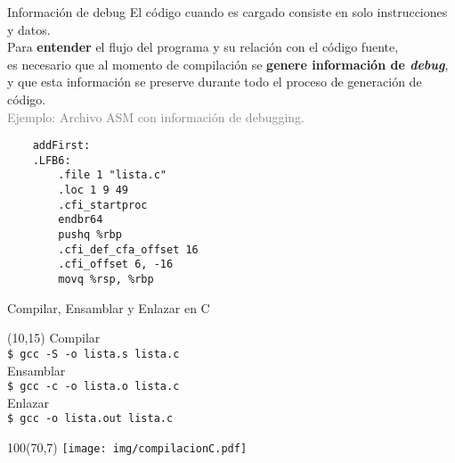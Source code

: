 \documentclass[aspectratio=169]{beamer}
\begin{document}
\begin{frame}[fragile,t]{Información de debug}
    El código cuando es cargado consiste en solo instrucciones y datos.\\
    \bigskip
    Para \textbf{entender} el flujo del programa y su relación con el código fuente,\\
    es necesario que al momento de compilación se \textbf{genere información de \emph{debug}},\\
    y que esta información se preserve durante todo el proceso de generación de código.\\
    \bigskip
    \pause
    \textcolor{gray}{Ejemplo: Archivo ASM con información de debugging.}
    { \small
    \begin{verbatim}
    addFirst:
    .LFB6:
        .file 1 "lista.c"
        .loc 1 9 49
        .cfi_startproc
        endbr64
        pushq %rbp
        .cfi_def_cfa_offset 16
        .cfi_offset 6, -16
        movq %rsp, %rbp
    \end{verbatim} }
\end{frame}


\begin{frame}[fragile,t]{Compilar, Ensamblar y Enlazar en C}
    \begin{textblock}{60}(10,15)
    \textcolor{naranjauca}{Compilar}\\
    \texttt{\$ gcc -S -o lista.s lista.c}\\
    \bigskip
    \textcolor{naranjauca}{Ensamblar}\\
    \texttt{\$ gcc -c -o lista.o lista.c}\\ %
    \bigskip
    \textcolor{naranjauca}{Enlazar}\\
    \texttt{\$ gcc -o lista.out lista.c}\\
    \end{textblock}
    \begin{textblock}{100}(70,7)
     \texttt{[image: img/compilacionC.pdf]}
    \end{textblock}
\end{frame}

\end{document}
